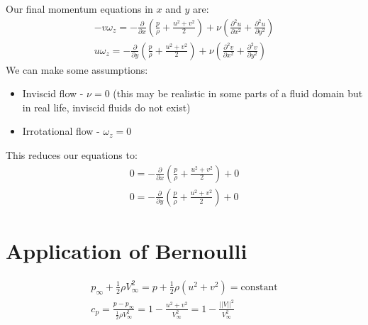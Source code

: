 \documentclass[class=report, crop=false, 12pt,a4paper]{standalone}
\begin{document}
Our final momentum equations in $x$ and $y$ are: 
\begin{gather}
  -v \omega_z = - \frac{\partial}{\partial x} \left( \frac{p}{\rho} + \frac{u^2 + v^2}{2} \right) + \nu \left( \frac{\partial^2 u}{\partial x^2} + \frac{\partial^2 u}{\partial y^2} \right)\\
  u \omega_z = - \frac{\partial}{\partial y} \left( \frac{p}{\rho} + \frac{u^2 + v^2}{2} \right) + \nu \left( \frac{\partial^2 v}{\partial x^2} + \frac{\partial^2 v}{\partial y^2} \right)
\end{gather}
We can make some assumptions:
\begin{itemize}
  \item Inviscid flow - $\nu = 0$ (this may be realistic in some parts of a fluid domain but in real life, inviscid fluids do not exist)
  \item Irrotational flow - $\omega_z = 0$
\end{itemize}
This reduces our equations to:
\begin{gather}
  0 = - \frac{\partial}{\partial x} \left( \frac{p}{\rho} + \frac{u^2 + v^2}{2} \right) + 0\\
  0 = - \frac{\partial}{\partial y} \left( \frac{p}{\rho} + \frac{u^2 + v^2}{2} \right) + 0
\end{gather}
\section{Application of Bernoulli}
\begin{gather}
  p_\infty + \frac{1}{2} \rho V_\infty^2 = p + \frac{1}{2} \rho (u^2 + v^2) = \textrm{constant}\\
  c_p = \frac{p - p_{\infty}}{\frac{1}{2} \rho V_{\infty}^2} = 1 - \frac{u^2 + v^2}{V_\infty^2} = 1 - \frac{||V||^2}{V_\infty^2}
\end{gather}
\end{document}
